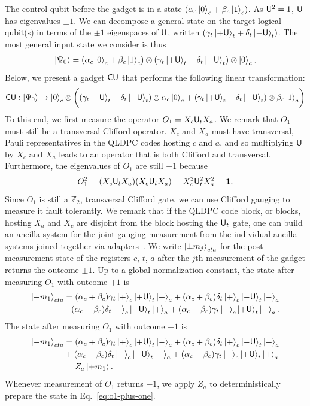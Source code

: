 \documentclass[11pt]{article}
\begin{document}
The control qubit before the gadget is in a state $(\alpha_c\ket{0}_{c}  + \beta_c\ket{1}_c )$. 
As $\mathsf{U}^2=1$, $\mathsf{U}$ has eigenvalues $\pm1$. 
We can decompose a general state on the target logical qubit(s) in terms of the $\pm1$ eigenspaces of $\mathsf{U}$, written $(\gamma_t\ket{+\mathsf{U}}_t+\delta_t\ket{-\mathsf{U}}_t)$. 
The most general input state we consider is thus
\begin{align}
    \ket{\Psi_0} = (\alpha_c\ket{0}_{c}  + \beta_c\ket{1}_c )\otimes (\gamma_t\ket{+\mathsf{U}}_t+\delta_t\ket{-\mathsf{U}}_t)\otimes \ket{0}_a.
\end{align}
Below, we present a gadget $\mathsf{CU}$ that performs the following linear transformation:
\begin{align}
    \mathsf{CU}: \ket{\Psi_0} \to
    \ket{0}_c \otimes\biggl( (\gamma_t\ket{+\mathsf{U}}_t +\delta_t\ket{-\mathsf{U}}_t)\otimes \alpha_c \ket{0}_a + (\gamma_t\ket{+\mathsf{U}}_t-\delta_t\ket{-\mathsf{U}}_t)\otimes \beta_c\ket{1}_a\biggr)
\end{align}
To this end, we first measure the operator $O_1 = X_c\mathsf{U}_tX_a$. 
We remark that $O_1$ must still be a transversal Clifford operator. $X_c$ and $X_a$ must have transversal, Pauli representatives in the QLDPC codes hosting $c$ and $a$, and so multiplying $\mathsf{U}$ by $X_c$ and $X_a$ leads to an operator that is both Clifford and transversal.
Furthermore, the eigenvalues of $O_1$ are still $\pm 1$ because $$O_1^2 = (X_c\mathsf{U}_tX_a)(X_c\mathsf{U}_tX_a) = X_c^2 \mathsf{U}_t^2 X_a^2 = \mathbf{1}.$$
Since $O_1$ is still a $\mathbb{Z}_2$, transversal Clifford gate, we can use Clifford gauging to measure it fault tolerantly. We remark that if the QLDPC code block, or blocks, hosting $X_a$ and $X_c$ are disjoint from the block hosting the $\mathsf{U}_t$ gate, one can build an ancilla system for the joint gauging measurement from the individual ancilla systems joined together via adapters~\cite{swaroop2025universaladaptersquantumldpc}. We write $\ket{\pm m_j}_{cta}$ for the post-measurement state of the registers $c$, $t$, $a$ after the $j$th measurement of the gadget returns the outcome $\pm 1$.
Up to a global normalization constant, the state after measuring $O_1$ with outcome $+1$ is
\begin{align}
    \ket{+m_1}_{cta}=(\alpha_c+\beta_c)\gamma_t \ket{+}_c\ket{+\mathsf{U}}_t \ket{+}_a +(\alpha_c + \beta_c)\delta_t \ket{+}_c\ket{-\mathsf{U}}_t \ket{-}_a \notag\\
    +(\alpha_c - \beta_c)\delta_t \ket{-}_c\ket{-\mathsf{U}}_t\ket{+}_a +(\alpha_c -\beta_c)\gamma_t \ket{-}_c\ket{+\mathsf{U}}_t\ket{-}_a.
    \label{eq:o1-plus-one}
\end{align}
The state after measuring $O_1$ with outcome $-1$ is
\begin{align}
    \ket{-m_1}_{cta}&=
    (\alpha_c+\beta_c)\gamma_t \ket{+}_c\ket{+\mathsf{U}}_t \ket{-}_a +(\alpha_c + \beta_c)\delta_t \ket{+}_c\ket{-\mathsf{U}}_t \ket{+}_a \label{eq:o1-minus-one}\\
    &+(\alpha_c - \beta_c)\delta_t \ket{-}_c\ket{-\mathsf{U}}_t\ket{-}_a +(\alpha_c -\beta_c)\gamma_t \ket{-}_c\ket{+\mathsf{U}}_t\ket{+}_a
    \notag\\&=Z_a\ket{+m_1}.
\end{align}
Whenever measurement of $O_1$ returns $-1$, we apply $Z_a$ to deterministically prepare the state in Eq.~\eqref{eq:o1-plus-one}.
\end{document}
